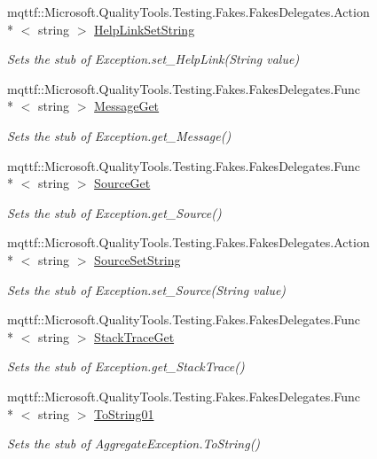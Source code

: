 \begin{DoxyCompactItemize}
mqttf\-::\-Microsoft.\-Quality\-Tools.\-Testing.\-Fakes.\-Fakes\-Delegates.\-Action\\*
$<$ string $>$ \hyperlink{class_system_1_1_fakes_1_1_stub_aggregate_exception_a566f008c3c49d125fb47fa988f830e3d}{Help\-Link\-Set\-String}
\begin{DoxyCompactList}\small\item\em Sets the stub of Exception.\-set\-\_\-\-Help\-Link(\-String value)\end{DoxyCompactList}\item 
mqttf\-::\-Microsoft.\-Quality\-Tools.\-Testing.\-Fakes.\-Fakes\-Delegates.\-Func\\*
$<$ string $>$ \hyperlink{class_system_1_1_fakes_1_1_stub_aggregate_exception_a06472927ced0b0be408bc3b62af270f5}{Message\-Get}
\begin{DoxyCompactList}\small\item\em Sets the stub of Exception.\-get\-\_\-\-Message()\end{DoxyCompactList}\item 
mqttf\-::\-Microsoft.\-Quality\-Tools.\-Testing.\-Fakes.\-Fakes\-Delegates.\-Func\\*
$<$ string $>$ \hyperlink{class_system_1_1_fakes_1_1_stub_aggregate_exception_a376572faf8d28ffce4f987c5e451e48a}{Source\-Get}
\begin{DoxyCompactList}\small\item\em Sets the stub of Exception.\-get\-\_\-\-Source()\end{DoxyCompactList}\item 
mqttf\-::\-Microsoft.\-Quality\-Tools.\-Testing.\-Fakes.\-Fakes\-Delegates.\-Action\\*
$<$ string $>$ \hyperlink{class_system_1_1_fakes_1_1_stub_aggregate_exception_a01845a2418a9def8981f7f8eb8f3fda7}{Source\-Set\-String}
\begin{DoxyCompactList}\small\item\em Sets the stub of Exception.\-set\-\_\-\-Source(\-String value)\end{DoxyCompactList}\item 
mqttf\-::\-Microsoft.\-Quality\-Tools.\-Testing.\-Fakes.\-Fakes\-Delegates.\-Func\\*
$<$ string $>$ \hyperlink{class_system_1_1_fakes_1_1_stub_aggregate_exception_adcc9f9b43ca2bd6e53ce2e7c00601e10}{Stack\-Trace\-Get}
\begin{DoxyCompactList}\small\item\em Sets the stub of Exception.\-get\-\_\-\-Stack\-Trace()\end{DoxyCompactList}\item 
mqttf\-::\-Microsoft.\-Quality\-Tools.\-Testing.\-Fakes.\-Fakes\-Delegates.\-Func\\*
$<$ string $>$ \hyperlink{class_system_1_1_fakes_1_1_stub_aggregate_exception_a4d210be0fd671859d5fb3e7ebd8ca190}{To\-String01}
\begin{DoxyCompactList}\small\item\em Sets the stub of Aggregate\-Exception.\-To\-String()\end{DoxyCompactList}\end{DoxyCompactItemize}
